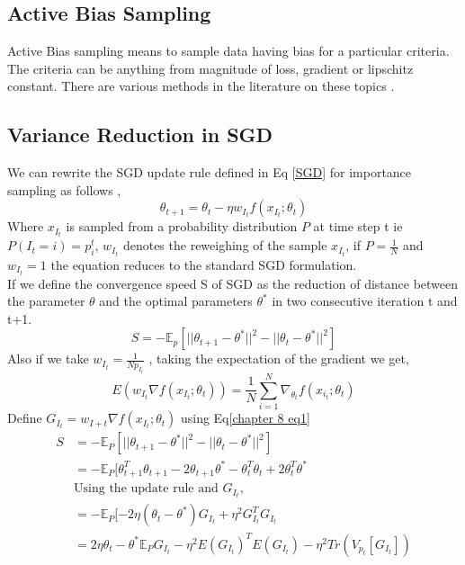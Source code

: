 \documentclass[a4paper,twoside]{iiththesis}
\theoremstyle{definition}
\theoremstyle{definition}
\theoremstyle{remark}
\begin{document}
\subsection{Active Bias Sampling}

Active Bias sampling means to sample data having bias for a particular criteria. The criteria can be anything from magnitude of loss, gradient or lipschitz constant. There are various methods in the literature on these topics \cite{katharopoulos2017biased} \cite{katharopoulos2018not} \cite{zhao2015stochastic} \cite{chang2017active}.

\subsection{Variance Reduction in SGD}
We can rewrite the SGD update rule  defined in Eq \ref{SGD} for importance sampling as follows ,
\begin{equation}
\theta_{t+1} = \theta_{t} - \eta w_{I_t} f(x_{I_t}; \theta_t)
\end{equation}
Where $x_{I_t}$ is sampled from a probability distribution $P$ at time step t  ie $P(I_t = i) = p_i^t $, $w_{I_t}$ denotes the reweighing of the sample $x_{I_{t}}$, if $P = \frac{1}{N}$ and $w_{I_{t}} = 1$ the equation reduces to the standard SGD formulation.
\\
If we define the convergence speed S of SGD as the reduction of distance between the parameter $\theta$ and the optimal parameters $\theta^*$ in two consecutive iteration t and t+1.
\begin{equation}\label{chapter 8 eq1}
S = - \mathbb{E}_{p}[ || \theta_{t+1} - \theta^* || ^2 - || \theta_{t} - \theta^* || ^2 ]
\end{equation}
Also if we take $w_{I_t} = \frac{1}{N p_{I_t}}$ , taking the expectation of the gradient we get, 
\begin{equation}
E( w_{I_t} \nabla f(x_{I_t}; \theta_t)) = \frac{1}{N} \sum_{i=1}^N \nabla_{\theta_t}  f(x_{i_t}; \theta_t)
\end{equation}
Define $G_{I_t} = w_{I+t} \nabla f(x_{I_t}; \theta_t)$ using Eq\ref{chapter 8 eq1}
\begin{align}
S &= - \mathbb{E}_{P}[ || \theta_{t+1} - \theta^* || ^2 - || \theta_{t} - \theta^* || ^2 ] \\
&= - \mathbb{E}_{P} [\theta_{t+1}^T \theta_{t+1} - 2 \theta_{t+1} \theta^* - \theta_{t}^T\theta_{t} + 2 \theta_{t}^T \theta^* \\
& \text{Using the update rule and } G_{I_t}, \\
&= -\mathbb{E}_{P} [-2\eta(\theta_{t} - \theta^*) G_{I_t} + \eta^2 G_{I_t}^T G_{I_t} \\
&=2 \eta \theta_{t} - \theta^* \mathbb{E}_{P} G_{I_t} - \eta^2 E(G_{I_t})^T E(G_{I_t}) - \eta^2 Tr(V_{p_t}[G_{I_t}])
\end{align}
\end{document}
